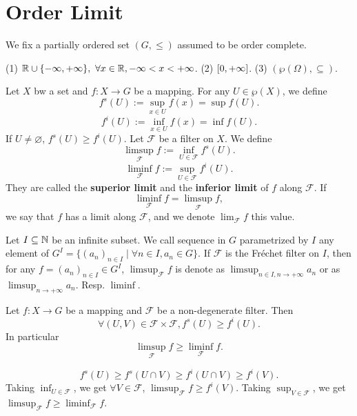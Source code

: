 \section{Order Limit}
We fix a partially ordered set $(G,\le)$ assumed to be order complete.
\begin{exampleenv}
    \quad
    \newline
    (1) $\mathbb{R}\cup\{-\infty,+\infty\}, \ \forall x\in \mathbb{R}, -\infty<x<+\infty$.
    \newline
    (2) $\interval{0}{+\infty}$.
    \newline
    (3) $\left(\wp(\Omega),\subseteq\right)$.
\end{exampleenv}
\begin{definitionenv}
    Let $X$ bw a set and $f:X\longrightarrow G$ be a mapping. For any $U\in \wp(X)$, we define 
    $$f^s(U):=\sup_{x\in U}f(x)=\sup f(U).$$
    $$f^i(U):=\inf_{x\in U}f(x)=\inf f(U).$$
    If $U\not=\varnothing$, $f^s(U)\ge f^i(U)$. Let $\mathcal{F}$ be a filter on $X$. We define 
    $$\limsup_\mathcal{F} f:=\inf_{U\in \mathcal{F}} f^s(U).$$
    $$\liminf_\mathcal{F} f:=\sup_{U\in \mathcal{F}} f^i(U).$$
    They are called the \textbf{superior limit} and the \textbf{inferior limit} of $f$ along $\mathcal{F}$. If 
    $$\liminf_\mathcal{F} f=\limsup_\mathcal{F} f,$$
    we say that $f$ has a limit along $\mathcal{F}$, and we denote $\displaystyle \lim_{\mathcal{F}}f$ this value.
\end{definitionenv}
\begin{notationenv}
    Let $I\subseteq \mathbb{N}$ be an infinite subset. We call sequence in $G$ parametrized by $I$ any element of $G^I=\{(a_n)_{n\in I}\mid \forall n\in I,a_n\in G\}$. If $\mathcal{F}$ is the Fréchet filter on $I$, then for any $f=(a_n)_{n\in I}\in G^I$, $\limsup_{\mathcal{F}}f$ is denote as $\displaystyle\limsup_{n\in I, n\rightarrow+\infty}a_n$ or as $\limsup_{n\rightarrow +\infty}a_n$. Resp. $\liminf$.
\end{notationenv}
\begin{propositionenv}
    Let $f:X\longrightarrow G$ be a mapping and $\mathcal{F}$ be a non-degenerate filter. Then 
    $$\forall (U,V)\in \mathcal{F}\times\mathcal{F}, f^{s}(U)\ge f^i(U).$$
    In particular 
    $$\limsup_\mathcal{F}f\ge \liminf_\mathcal{F}f.$$
\end{propositionenv}
\begin{proofenv}
    $$f^s(U)\ge f^s(U\cap V)\ge f^i(U\cap V)\ge f^i(V).$$
    Taking $\inf_{U\in \mathcal{F}}$, we get $\forall V\in \mathcal{F}$, $\limsup_{\mathcal{F}}f\ge f^i(V)$. Taking $\sup_{V\in \mathcal{F}}$, we get $\limsup_{\mathcal{F}}f\ge \liminf_{\mathcal{F}}f$.
\end{proofenv}
